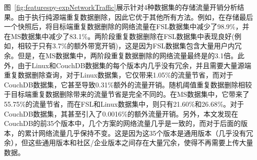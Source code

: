 图~\ref{fig:featurespy-expNetworkTraffic}展示针对4种数据集的存储流量开销分析结果。由于\prototype 执行纯源端重复数据删除，因此它优于其他所有方法。例如，在存储最后一个快照后，\prototype 将目标端重复数据删除的网络流量在FSL数据集中减少了98.9\%，并在MS数据集中减少了83.1\%。两阶段重复数据删除在FSL数据集中表现良好(例如，相较于\prototype 只有3.7\%的额外带宽开销)，这是因为FSL数据集包含大量用户内冗余。但是，在MS数据集中，两阶段重复数据删除的网络流量最终是\prototype 的3.1倍。此外，由于Linux和CouchDB数据集的每个版本内几乎没有冗余，并且需要大量源端重复数据删除查询，对于Linux数据集，它仅带来1.05\%的流量节省，而对于CouchDB数据集，它甚至导致0.31\%额外的流量开销。随机阈值重复数据删除相较于目标端重复数据删除带来的流量节省是完全不同的。在MS数据集中，它带来了55.75\%的流量节省，而在FSL和Linux数据集中，则只有21.60\%和26.68\%。对于CouchDB数据集，其甚至引入了0.0016\%的额外流量开销。另外，本文发现在CouchDB的前35个版本中，几个方案的网络流量几乎是一致的，而对于后面的版本，\prototype 的累计网络流量几乎保持不变。这是因为这35个版本是通用版本（几乎没有冗余），但这些通用版本和社区/企业版本之间存在大量冗余，使得\prototype 不再需要上传大量数据。